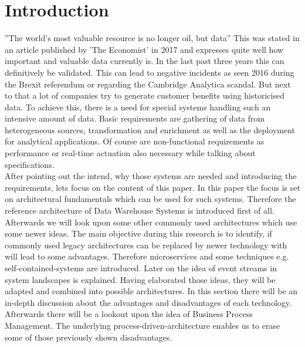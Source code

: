 \section{Introduction}
''The world’s most valuable resource is no longer oil, but data'' \cite{dataIsOil}\newline
This was stated in an article published by 'The Economist' in 2017 and expresses quite well how important and valuable data currently is. In the last past three years this can definitively be validated. This can lead to negative incidents as seen 2016 during the Brexit referendum or regarding the Cambridge Analytica scandal. But next to that a lot of companies try to generate customer benefits using historicised data.\newline
To achieve this, there is a need for special systems handling such an intensive amount of data. Basic requirements are gathering of data from heterogeneous sources, transformation and enrichment as well as the deployment for analytical applications. Of course are non-functional requirements as performance or real-time actuation also necessary while talking about specifications.\newline
\\
After pointing out the intend, why those systems are needed and introducing the requirements, lets focus on the content of this paper.\newline 
In this paper the focus is set on architectural fundamentals which can be used for such systems. Therefore the reference architecture of Data Warehouse Systems is introduced first of all. Afterwards we will look upon some other commonly used architectures which use some newer ideas.
The main objective during this research is to identify, if commonly used legacy architectures can be replaced by newer technology with will lead to some advantages.
\newline
Therefore microservices and some techniques e.g. self-contained-systems are introduced. Later on the idea of event streams in system landscapes is explained.\newline
Having elaborated those ideas, they will be adapted and combined into possible architectures. In this section there will be an in-depth discussion about the advantages and disadvantages of each technology.\newline
Afterwards there will be a lookout upon the idea of Business Process Management. The underlying process-driven-architecture enables us to erase some of those previously shown disadvantages.\newline
